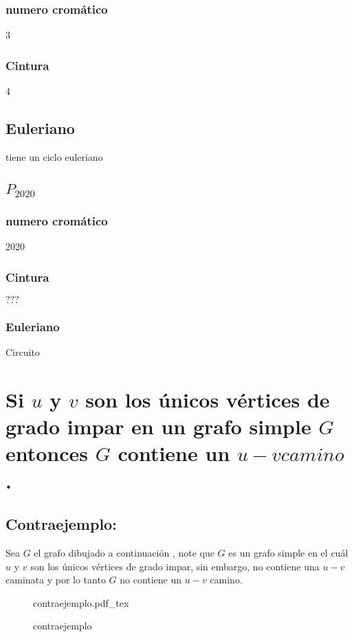 \documentclass[10pt,a4paper]{article} %
\newcommand{\incfig}[1]{%
    \def\svgwidth{\columnwidth}
    {#1.pdf_tex}
}
\begin{document}
                    \subsubsection{numero cromático}
                        3
                    \subsubsection{Cintura}
                        4
                    \subsection{Euleriano}
                        tiene un ciclo euleriano
                \subsection{$ P_{2020}  $ }
                    \subsubsection{numero cromático}
                        2020
                    \subsubsection{Cintura}
                        $ ???  $
                    \subsubsection{Euleriano}
                        Circuito



            \section{Si $ u  $ y $ v  $ son los únicos vértices de grado impar
            en un grafo simple $ G  $ entonces $ G  $ contiene un $ u-v camino
            $ .}
                \subsection{Contraejemplo:}
                    Sea $ G  $ el grafo dibujado a continuación , note que $ G
                    $ es un grafo simple en el cuál $ u  $ y $ v  $ son los
                    únicos vértices de grado impar, sin embargo, no contiene
                    una $ u-v  $ caminata y por lo tanto $ G  $ no contiene un $
                    u-v  $ camino.
                    \begin{figure}[ht]
                        \centering
                        \incfig{contraejemplo}
                        \caption{contraejemplo}
                        \label{fig:contraejemplo}
                    \end{figure}










    \nocite{*}
    
    
\end{document}
